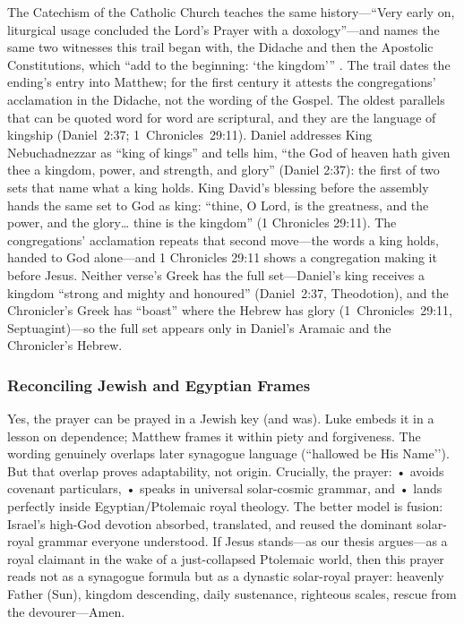 The Catechism of the Catholic Church teaches the same history---``Very early on, liturgical usage concluded the Lord's Prayer with a doxology''---and names the same two witnesses this trail began with, the Didache and then the Apostolic Constitutions, which ``add to the beginning: `the kingdom''' \cite[2760]{ccc}.
The trail dates the ending's entry into Matthew; for the first century it attests the congregations' acclamation in the Didache, not the wording of the Gospel.
The oldest parallels that can be quoted word for word are scriptural, and they are the language of kingship (Daniel~2:37; 1~Chronicles~29:11).
Daniel addresses King Nebuchadnezzar as ``king of kings'' and tells him, ``the God of heaven hath given thee a kingdom, power, and strength, and glory'' (Daniel 2:37): the first of two sets that name what a king holds.
King David's blessing before the assembly hands the same set to God as king: ``thine, O Lord, is the greatness, and the power, and the glory\ldots{} thine is the kingdom'' (1 Chronicles 29:11).
The congregations' acclamation repeats that second move---the words a king holds, handed to God alone---and 1 Chronicles 29:11 shows a congregation making it before Jesus.
Neither verse's Greek has the full set---Daniel's king receives a kingdom ``strong and mighty and honoured'' (Daniel~2:37, Theodotion), and the Chronicler's Greek has ``boast'' where the Hebrew has glory (1~Chronicles~29:11, Septuagint)---so the full set appears only in Daniel's Aramaic and the Chronicler's Hebrew.

\subsubsection{Reconciling Jewish and Egyptian Frames}

Yes, the prayer can be prayed in a Jewish key (and was).
Luke embeds it in a lesson on dependence; Matthew frames it within piety and forgiveness.
The wording genuinely overlaps later synagogue language (``hallowed be His Name’’).
But that overlap proves adaptability, not origin.
Crucially, the prayer: • avoids covenant particulars, • speaks in universal solar-cosmic grammar, and • lands perfectly inside Egyptian/Ptolemaic royal theology.
The better model is fusion: Israel’s high-God devotion absorbed, translated, and reused the dominant solar-royal grammar everyone understood.
If Jesus stands---as our thesis argues---as a royal claimant in the wake of a just-collapsed Ptolemaic world, then this prayer reads not as a synagogue formula but as a dynastic solar-royal prayer: heavenly Father (Sun), kingdom descending, daily sustenance, righteous scales, rescue from the devourer---Amen.

